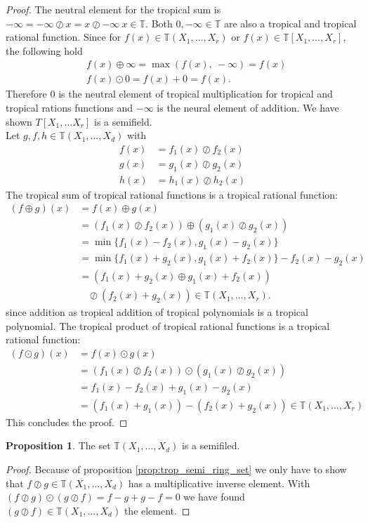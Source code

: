 \documentclass{article}
\theoremstyle{definition}
\newtheorem{proposition}[theorem]{Proposition}
\begin{document}
\begin{proof}
The neutral element for the tropical sum is $- \infty = - \infty \oslash x = x \oslash - \infty \ x \in \mathbb{T}$. Both $0, -\infty \in \mathbb{T}$ are also a tropical and tropical rational function. Since for $f(x) \in \mathbb{T}(X_1, \dots , X_r)$ or $f(x) \in \mathbb{T}[X_1, \dots , X_r]$, the following hold
\begin{align*}
&f(x) \oplus \infty = \max(f(x),\ - \infty) = f(x) \\
&f(x) \odot 0 = f(x) + 0 = f(x).
\end{align*} 
Therefore $0$ is the neutral element of tropical multiplication for tropical and tropical rations functions and $-\infty$ is the neural element of addition. We have shown $T[X_1, \dots X_r]$ is a semifield. \\ 
Let $g,f,h \in \mathbb{T}(X_1, \dots ,X_d)$ with 
\begin{align*}
f(x) &= f_1(x) \oslash f_2(x) \\
g(x) &= g_1(x) \oslash g_2(x) \\
h(x) &= h_1(x) \oslash h_2(x)
\end{align*}
The tropical sum of tropical rational functions is a tropical rational function:
\begin{align*}
(f \oplus g)(x) &= f(x) \oplus g(x) \\
&=(f_1(x) \oslash f_2(x)) \oplus (g_1(x) \oslash g_2(x)) \\
&= \min\{f_1(x) - f_2(x), g_1(x) - g_2(x) \} \\
&= \min\{f_1(x) + g_2(x), g_1(x) + f_2(x) \} - f_2(x) - g_2(x) \\
&= (f_1(x) + g_2(x) \oplus g_1(x) + f_2(x)) \\
& \ \ \ \ \oslash (f_2(x) + g_2(x)) \in \mathbb{T}(X_1, \dots , X_r).
\end{align*}
since addition as tropical addition of tropical polynomials is a tropical polynomial.
The tropical product of tropical rational functions is a tropical rational function:
\begin{align*}
(f \odot g)(x) &= f(x) \odot g(x) \\
&=  (f_1(x) \oslash f_2(x)) \odot (g_1(x) \oslash g_2(x)) \\
&= f_1(x) - f_2(x) + g_1(x) - g_2(x) \\
&= (f_1(x) + g_1(x)) - (f_2(x) + g_2(x)) \in \mathbb{T}(X_1, \dots , X_r)
\end{align*}
This concludes the proof.
\end{proof}

\begin{proposition}
The set $\mathbb{T}(X_1, \dots , X_d)$ is a semifiled.
\end{proposition}
\begin{proof}
Because of proposition \ref{prop:trop_semi_ring_set} we only have to show that $f \oslash g \in \mathbb{T}(X_1, \dots , X_d)$ has a multiplicative inverse element. With $(f \oslash g) \odot (g \oslash f) = f - g + g - f = 0$ we have found $(g \oslash f) \in \mathbb{T}(X_1, \dots , X_d)$ the element.
\end{proof}
\end{document}
